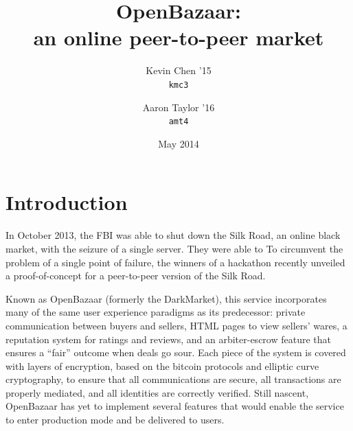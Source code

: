 \documentclass[12pt,twocolumn]{article}
\title{\bf \sc OpenBazaar: \\ an online peer-to-peer market}
\author{
    {\rm Kevin Chen '15} \\
    {\tt kmc3}
    \and 
    {\rm Aaron Taylor '16} \\
    {\tt amt4}
}
\date{May 2014}
\begin{document}
\maketitle

\doublespacing


\newcommand{\OpenBazaar}{}
\def\OpenBazaar/{{\sc OpenBazaar}}

\newcommand{\Entangled}{}
\def\Entangled/{{\sc Entangled}}

\newcommand{\Kademlia}{}
\def\Kademlia/{{\sc Kademlia}}

\newcommand{\Twisted}{}
\def\Twisted/{{\sc Twisted}}

\newcommand{\Tornado}{}
\def\Tornado/{{\sc Tornado}}

\newcommand{\reactor}{}
\def\reactor/{{\sc reactor}}

\newcommand{\ZMQ}{}
\def\ZMQ/{\O{}MQ}

\newcommand{\kv}{}
\def\kv/{$\langle$key,value$\rangle$}

\newcommand{\findNode}{}
\def\findNode/{{\sc find\_node}}

\newcommand{\findValue}{}
\def\findValue/{{\sc find\_value}}

\newcommand{\ping}{}
\def\ping/{{\sc ping}}

\newcommand{\store}{}
\def\store/{{\sc store}}

\newcommand{\delete}{}
\def\delete/{{\sc delete}}

\section{Introduction}
In October 2013, the FBI was able to shut down the Silk Road, an online black market, with the seizure of a single server. They were able to 
To circumvent the problem of a single point of failure, the winners of a hackathon recently unveiled a proof-of-concept for a peer-to-peer version of the Silk Road.

Known as \OpenBazaar/ (formerly the DarkMarket), this service incorporates many of the same user experience paradigms as its predecessor: private communication between buyers and sellers, HTML pages to view sellers' wares, a reputation system for ratings and reviews, and an arbiter-escrow feature that ensures a ``fair'' outcome when deals go sour. Each piece of the system is covered with layers of encryption, based on the bitcoin protocols and elliptic curve cryptography, to ensure that all communications are secure, all transactions are properly mediated, and all identities are correctly verified.
Still nascent, \OpenBazaar/ has yet to implement several features that would enable the service to enter production mode and be delivered to users.
\end{document}
